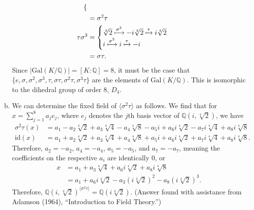 \documentclass[10pt]{extarticle}
\newcommand{\Q}{\mathbb{Q}}
\begin{document}
\begin{enumerate}[(a)]
\begin{align*}
\begin{cases}
              \end{cases}\\
                           &= \sigma^2\tau\\
                \tau\sigma^3 &= \begin{cases}
                  \sqrt[4]{2} \xmapsto{\sigma^3}-i\sqrt[4]{2}\xmapsto{\tau}i\sqrt[4]{2}\\
                  i \xmapsto{\sigma^3}i\xmapsto{\tau}-i
                \end{cases}\\
                             &= \sigma\tau.
      \end{align*}
      Since $|\text{Gal}(K/\Q)| = [K:\Q] = 8$, it must be the case that $\{e,\sigma,\sigma^2,\sigma^3,\tau,\sigma\tau,\sigma^2\tau,\sigma^3\tau\}$ are the elements of $\text{Gal}(K/\Q)$. This is isomorphic to the dihedral group of order 8, $D_4$.
    \item We can determine the fixed field of $\langle \sigma^2\tau\rangle$ as follows. We find that for $x = \sum_{j=1}^{8}a_je_j$, where $e_j$ denotes the $j$th basis vector of $\Q(i,\sqrt[4]{2})$, we have
      \begin{align*}
        \sigma^2\tau(x) &= a_1 - a_2\sqrt[4]{2} + a_3\sqrt[4]{4} - a_4\sqrt[4]{8} - a_5i + a_6i\sqrt[4]{2} - a_7i\sqrt[4]{4} + a_8i\sqrt[4]{8}\\
        \text{id}(x) &= a_1 + a_2\sqrt[4]{2} + a_3\sqrt[4]{4} + a_4\sqrt[4]{8} + a_5i + a_6i\sqrt[4]{2} + a_7i\sqrt[4]{4} + a_8i\sqrt[4]{8}.
      \end{align*}
      Therefore, $a_2 = -a_2$, $a_4 = -a_4$, $a_5 = -a_5$, and $a_7 = -a_7$, meaning the coefficients on the respective $a_i$ are identically $0$, or
      \begin{align*}
        x &= a_1 + a_3\sqrt[4]{4} + a_6i\sqrt[4]{2} + a_8i\sqrt[4]{8}\\
          &= a_1 + a_6i\sqrt[4]{2} - a_3\left(i\sqrt[4]{2}\right)^2 - a_8\left(i\sqrt[4]{2}\right)^3.
      \end{align*}
      Therefore, $\Q\left(i,\sqrt[4]{2}\right)^{\langle \sigma^2\tau \rangle} = \Q(i\sqrt[4]{2})$. {\tiny (Answer found with assistance from Adamson (1964), ``Introduction to Field Theory.'')}


\end{enumerate}
\end{document}
